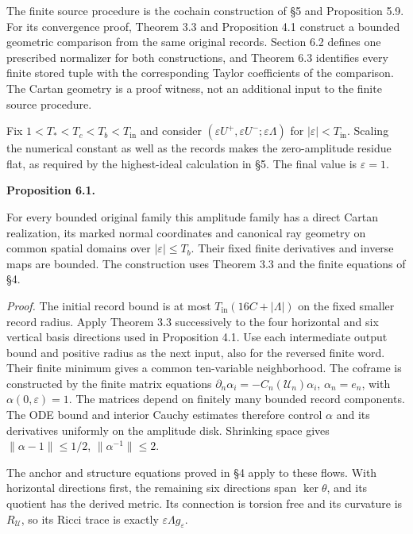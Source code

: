 \documentclass[
  english,
  11pt,
  reqno]{amsart}
\makeatletter
\newcommand{\pandocstatementheading}[1]{%
  \par\addpenalty{\@beginparpenalty}%
  \addvspace{.5\baselineskip plus .2\baselineskip minus .2\baselineskip}%
  {\normalfont\bfseries #1\par}%
  \nobreak\@afterindenttrue\@afterheading
}
\makeatother
\begin{document}
The finite source procedure is the cochain construction of §5 and
Proposition 5.9. For its convergence proof, Theorem 3.3 and Proposition
4.1 construct a bounded geometric comparison from the same original
records. Section 6.2 defines one prescribed normalizer for both
constructions, and Theorem 6.3 identifies every finite stored tuple with
the corresponding Taylor coefficients of the comparison. The Cartan
geometry is a proof witness, not an additional input to the finite
source procedure.

Fix \(1<T_*<T_c<T_b<T_{\mathrm{in}}\) and consider
\((\varepsilon U^+,\varepsilon U^-;\varepsilon\Lambda)\) for
\(|\varepsilon|<T_{\mathrm{in}}\). Scaling the numerical constant as
well as the records makes the zero-amplitude residue flat, as required
by the highest-ideal calculation in §5. The final value is
\(\varepsilon=1\).

\pandocstatementheading{\protect{}\label{prop:gg-common-cartan-witness}Proposition 6.1.}

For every bounded original family this amplitude family has a direct
Cartan realization, its marked normal coordinates and canonical ray
geometry on common spatial domains over \(|\varepsilon|\le T_b\). Their
fixed finite derivatives and inverse maps are bounded. The construction
uses Theorem 3.3 and the finite equations of §4.

\emph{Proof.} The initial record bound is at most
\(T_{\mathrm{in}}(16C+|\Lambda|)\) on the fixed smaller record radius.
Apply Theorem 3.3 successively to the four horizontal and six vertical
basis directions used in Proposition 4.1. Use each intermediate output
bound and positive radius as the next input, also for the reversed
finite word. Their finite minimum gives a common ten-variable
neighborhood. The coframe is constructed by the finite matrix equations
\(\partial_n\alpha_i=-C_n(\mathcal U_n)\alpha_i\), \(\alpha_n=e_n\),
with \(\alpha(0,\varepsilon)=1\). The matrices depend on finitely many
bounded record components. The ODE bound and interior Cauchy estimates
therefore control \(\alpha\) and its derivatives uniformly on the
amplitude disk. Shrinking space gives \(\|\alpha-1\|\le1/2\),
\(\|\alpha^{-1}\|\le2\).

The anchor and structure equations proved in §4 apply to these flows.
With horizontal directions first, the remaining six directions span
\(\ker\theta\), and its quotient has the derived metric. Its connection
is torsion free and its curvature is \(R_{\mathcal U}\), so its Ricci
trace is exactly \(\varepsilon\Lambda g_\varepsilon\).
\end{document}
